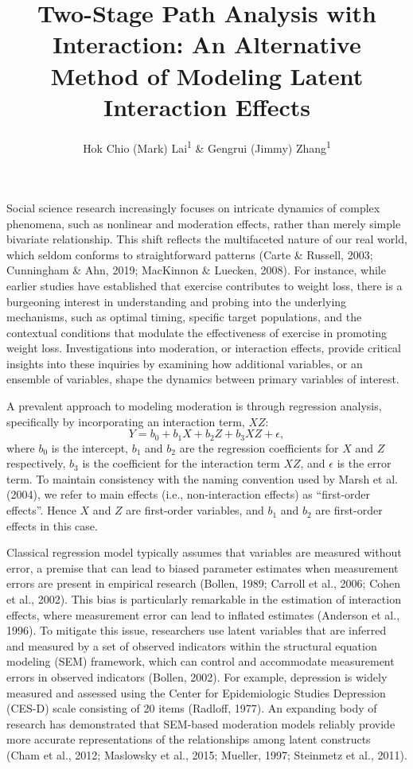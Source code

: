 \documentclass[
  man,mask]{apa6}
\title{Two-Stage Path Analysis with Interaction: An Alternative Method of Modeling Latent Interaction Effects}
\author{Hok Chio (Mark) Lai\textsuperscript{1} \& Gengrui (Jimmy) Zhang\textsuperscript{1}}
\date{}
\affiliation{\vspace{0.5cm}\textsuperscript{1} University of Southern California}
\begin{document}
\maketitle

Social science research increasingly focuses on intricate dynamics of complex phenomena, such as nonlinear and moderation effects, rather than merely simple bivariate relationship. This shift reflects the multifaceted nature of our real world, which seldom conforms to straightforward patterns (Carte \& Russell, 2003; Cunningham \& Ahn, 2019; MacKinnon \& Luecken, 2008). For instance, while earlier studies have established that exercise contributes to weight loss, there is a burgeoning interest in understanding and probing into the underlying mechanisms, such as optimal timing, specific target populations, and the contextual conditions that modulate the effectiveness of exercise in promoting weight loss. Investigations into moderation, or interaction effects, provide critical insights into these inquiries by examining how additional variables, or an ensemble of variables, shape the dynamics between primary variables of interest.

A prevalent approach to modeling moderation is through regression analysis, specifically by incorporating an interaction term, \(XZ\):
\begin{equation}
Y = b_{0} + b_{1}X + b_{2}Z + b_{3}XZ + \epsilon,
\end{equation}
where \(b_{0}\) is the intercept, \(b_{1}\) and \(b_{2}\) are the regression coefficients for \(X\) and \(Z\) respectively, \(b_{3}\) is the coefficient for the interaction term \(XZ\), and \(\epsilon\) is the error term. To maintain consistency with the naming convention used by Marsh et al. (2004), we refer to main effects (i.e., non-interaction effects) as ``first-order effects''. Hence \(X\) and \(Z\) are first-order variables, and \(b_{1}\) and \(b_{2}\) are first-order effects in this case.

Classical regression model typically assumes that variables are measured without error, a premise that can lead to biased parameter estimates when measurement errors are present in empirical research (Bollen, 1989; Carroll et al., 2006; Cohen et al., 2002). This bias is particularly remarkable in the estimation of interaction effects, where measurement error can lead to inflated estimates (Anderson et al., 1996). To mitigate this issue, researchers use latent variables that are inferred and measured by a set of observed indicators within the structural equation modeling (SEM) framework, which can control and accommodate measurement errors in observed indicators (Bollen, 2002). For example, depression is widely measured and assessed using the Center for Epidemiologic Studies Depression (CES-D) scale consisting of 20 items (Radloff, 1977). An expanding body of research has demonstrated that SEM-based moderation models reliably provide more accurate representations of the relationships among latent constructs (Cham et al., 2012; Maslowsky et al., 2015; Mueller, 1997; Steinmetz et al., 2011).
\end{document}
